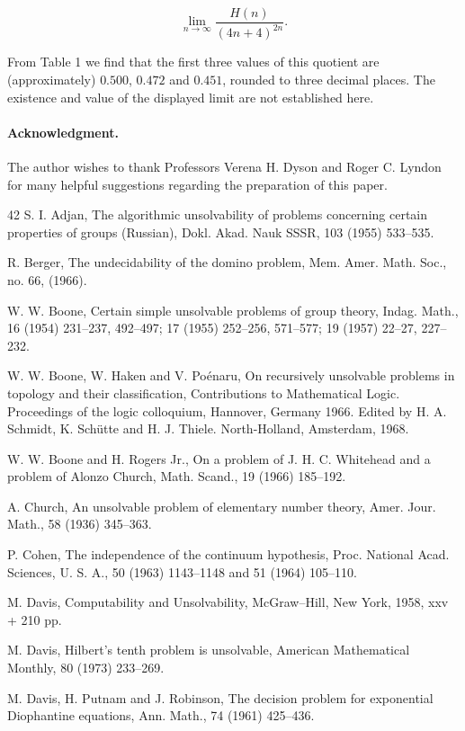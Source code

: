 \documentclass[11pt]{article}
\newcommand{\origpage}[1]{\marginnote{\footnotesize\textbf{[#1]}}}
\begin{document}
\[
\lim _{n \rightarrow \infty} \frac{H(n)}{(4 n+4)^{2 n}} .
\]

\origpage{737}From Table 1 we find that the first three values of this quotient are (approximately) $0.500$, $0.472$ and $0.451$, rounded to three decimal places. The existence and value of the displayed limit are not established here.

\paragraph{Acknowledgment.} The author wishes to thank Professors Verena H. Dyson and Roger C. Lyndon for many helpful suggestions regarding the preparation of this paper.

\begin{thebibliography}{42}
 S. I. Adjan, The algorithmic unsolvability of problems concerning certain properties of groups (Russian), Dokl. Akad. Nauk SSSR, 103 (1955) 533--535.

 R. Berger, The undecidability of the domino problem, Mem. Amer. Math. Soc., no. 66, (1966).

 W. W. Boone, Certain simple unsolvable problems of group theory, Indag. Math., 16 (1954) 231--237, 492--497; 17 (1955) 252--256, 571--577; 19 (1957) 22--27, 227--232.

 W. W. Boone, W. Haken and V. Poénaru, On recursively unsolvable problems in topology and their classification, Contributions to Mathematical Logic. Proceedings of the logic colloquium, Hannover, Germany 1966. Edited by H. A. Schmidt, K. Schütte and H. J. Thiele. North-Holland, Amsterdam, 1968.

 W. W. Boone and H. Rogers Jr., On a problem of J. H. C. Whitehead and a problem of Alonzo Church, Math. Scand., 19 (1966) 185--192.

 A. Church, An unsolvable problem of elementary number theory, Amer. Jour. Math., 58 (1936) 345--363.

 P. Cohen, The independence of the continuum hypothesis, Proc. National Acad. Sciences, U. S. A., 50 (1963) 1143--1148 and 51 (1964) 105--110.

 M. Davis, Computability and Unsolvability, McGraw--Hill, New York, 1958, xxv + 210 pp.

 M. Davis, Hilbert's tenth problem is unsolvable, American Mathematical Monthly, 80 (1973) 233--269.

 M. Davis, H. Putnam and J. Robinson, The decision problem for exponential Diophantine equations, Ann. Math., 74 (1961) 425--436.


\end{thebibliography}
\end{document}

